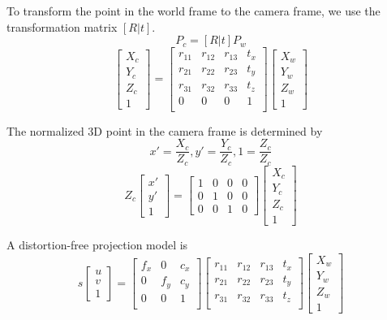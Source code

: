 To transform the point in the world frame to the camera frame, we use the transformation matrix $[R|t]$.
\[
P_c = [R|t] P_w
\]
\[
\begin{bmatrix}
    X_c \\ Y_c \\ Z_c \\ 1
\end{bmatrix} =
\begin{bmatrix}
    r_{11} & r_{12} & r_{13} & t_x \\
    r_{21} & r_{22} & r_{23} & t_y \\
    r_{31} & r_{32} & r_{33} & t_z \\
    0 & 0 & 0 &  1  \\
\end{bmatrix}
\begin{bmatrix}
    X_w \\ Y_w \\ Z_w \\ 1
\end{bmatrix}
\]

The normalized 3D point in the camera frame is determined by
\[
x' = \frac{X_c}{Z_c}, y' = \frac{Y_c}{Z_c}, 1 = \frac{Z_c}{Z_c}
\]
\[
Z_c \begin{bmatrix}
    x' \\ y' \\ 1
\end{bmatrix} =
\begin{bmatrix}
    1 & 0 & 0 & 0 \\
    0 & 1 & 0 & 0 \\
    0 & 0 & 1 & 0
\end{bmatrix}
\begin{bmatrix}
    X_c \\ Y_c \\ Z_c \\ 1
\end{bmatrix}
\]

A distortion-free projection model is
\[
s \begin{bmatrix}
    u \\ v \\ 1
\end{bmatrix} =
\begin{bmatrix}
    f_x & 0 & c_x \\
    0  & f_y& c_y \\
    0  & 0 &  1  \\
\end{bmatrix}
\begin{bmatrix}
    r_{11} & r_{12} & r_{13} & t_x \\
    r_{21} & r_{22} & r_{23} & t_y \\
    r_{31} & r_{32} & r_{33} & t_z \\
\end{bmatrix}
\begin{bmatrix}
    X_w \\ Y_w \\ Z_w \\ 1
\end{bmatrix}
\]

